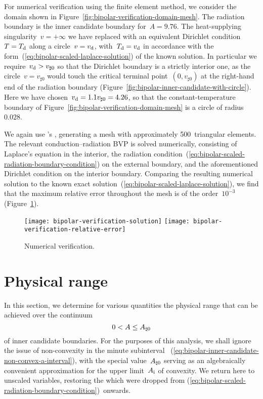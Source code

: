 For numerical verification using the finite element method,
we consider the domain shown
in Figure~\ref{fig:bipolar-verification-domain-mesh}.
The radiation boundary is the inner candidate boundary for~$A = 9.76$.
The heat-supplying singularity~$v = +\infty$
we have replaced with an equivalent Dirichlet condition~$T = T_{\mathrm{d}}$
along a circle~$v = v_{\mathrm{d}}$,
with~$T_{\mathrm{d}} = v_{\mathrm{d}}$ in accordance with
the form~(\ref{eq:bipolar-scaled-laplace-solution})
of the known solution.
In particular we require~$v_{\mathrm{d}} > v_{\sharp 0}$
so that the Dirichlet boundary is a strictly interior one,
as the circle~$v = v_{\sharp 0}$ would touch
the critical terminal point~$(0, v_{\sharp 0})$
at the right-hand end of the radiation boundary
(Figure~\ref{fig:bipolar-inner-candidate-with-circle}).
Here we have chosen~$v_{\mathrm{d}} = 1.1 v_{\sharp 0} = 4.26$,
so that the constant-temperature boundary
of Figure~\ref{fig:bipolar-verification-domain-mesh}
is a circle of radius~$0.028$.

We again use 's ,
generating a mesh with approximately 500~triangular elements.
The relevant conduction--radiation BVP is solved numerically,
consisting of Laplace's equation in the interior,
the radiation condition~(\ref{eq:bipolar-scaled-radiation-boundary-condition})
on the external boundary,
and the aforementioned Dirichlet condition on the interior boundary.
Comparing the resulting numerical solution
to the known exact solution~(\ref{eq:bipolar-scaled-laplace-solution}),
we find that the maximum relative error throughout the mesh
is of the order~$10^{-3}$
(Figure~\ref{fig:bipolar-verification}).

\begin{figure}
  \newcommand*{\subfigurewidth}{0.42\textwidth}
  \centering
  \hspace*{\fill}
  \texttt{[image: bipolar-verification-solution]}
    \hfill
  \texttt{[image: bipolar-verification-relative-error]}
  \hspace*{\fill}
  \caption{
    Numerical verification.
  }
  \label{fig:bipolar-verification}
\end{figure}

\section{Physical range}
\label{sec:bipolar.physical}

In this section, we determine for various quantities
the physical range that can be achieved over the continuum
\begin{equation}
  0 < A \le A_{\natural 0}
  \label{eq:bipolar-inner-candidate-existence-interval}
\end{equation}
of inner candidate boundaries.
For the purposes of this analysis,
we shall ignore the issue of non-convexity
in the minute subinterval~%
  (\ref{eq:bipolar-inner-candidate-non-convex-a-interval}),
with the special value~$A_{\natural 0}$
serving as an algebraically convenient approximation
for the upper limit~$A_{\mathrm{i}}$ of convexity.
We return here to unscaled variables,
restoring the \scalingmarks{} which were dropped
from (\ref{eq:bipolar-scaled-radiation-boundary-condition})~onwards.

